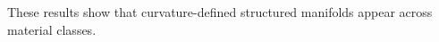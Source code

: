 \documentclass[12pt]{article}
\begin{document}
These results show that curvature-defined structured manifolds appear across material classes.

%
%
%
%
%
%
\end{document}
